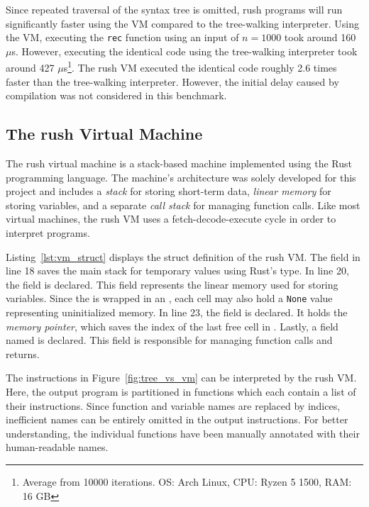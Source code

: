 Since repeated traversal of the syntax tree is omitted, rush programs will run significantly faster using the VM compared to the tree-walking interpreter.
Using the VM, executing the \texttt{rec} function using an input of $n = 1000$ took around 160 $\mu$s.
However, executing the identical code using the tree-walking interpreter took around 427 $\mu$s\footnote{Average from 10000 iterations. OS: Arch Linux, CPU: Ryzen 5 1500, RAM: 16 GB}.
The rush VM executed the identical code roughly 2.6 times faster than the tree-walking interpreter.
However, the initial delay caused by compilation was not considered in this benchmark.


\subsection{The rush Virtual Machine}

The rush virtual machine is a stack-based machine implemented using the Rust programming language.
The machine's architecture was solely developed for this project and includes a \emph{stack} for storing short-term data, \emph{linear memory} for storing variables, and a separate \emph{call stack} for managing function calls.
Like most virtual machines, the rush VM uses a fetch-decode-execute cycle in order to interpret programs.


Listing~\ref{lst:vm_struct} displays the struct definition of the rush VM\@.
The  field in line 18 saves the main stack for temporary values using Rust's  type.
In line 20, the  field is declared.
This field represents the linear memory used for storing variables.
Since the  is wrapped in an , each cell may also hold a \texttt{None} value representing uninitialized memory.
In line 23, the  field is declared.
It holds the \emph{memory pointer}, which saves the index of the last free cell in .
Lastly, a field named  is declared.
This field is responsible for managing function calls and returns.

The instructions in Figure~\ref{fig:tree_vs_vm} can be interpreted by the rush VM\@.
Here, the output program is partitioned in functions which each contain a list of their instructions.
Since function and variable names are replaced by indices, inefficient names can be entirely omitted in the output instructions.
For better understanding, the individual functions have been manually annotated with their human-readable names.

